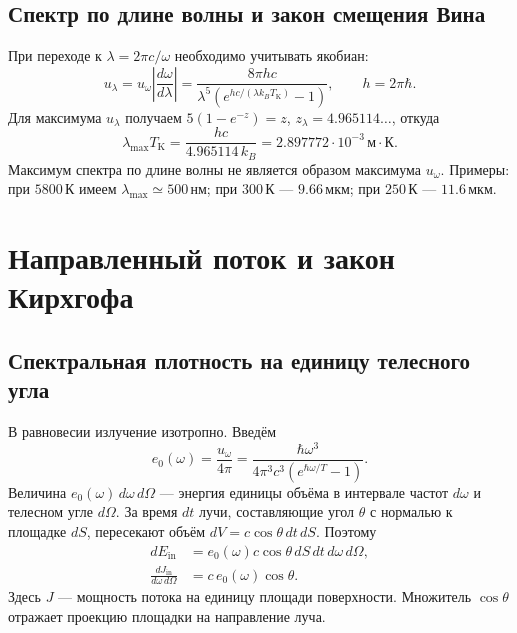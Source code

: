 \documentclass[../final.tex]{subfiles}
\begin{document}
\subsection{Спектр по длине волны и закон смещения Вина}
При переходе к $\lambda=2\pi c/\omega$ необходимо учитывать якобиан:
\begin{equation*}
 u_\lambda=u_\omega\left|\frac{d\omega}{d\lambda}\right|
 =\frac{8\pi hc}{\lambda^5(e^{hc/(\lambda k_BT_{\mathrm K})}-1)},\qquad h=2\pi\hbar.
\end{equation*}
Для максимума $u_\lambda$ получаем
$5(1-e^{-z})=z$, $z_\lambda=4.965114\ldots$, откуда
\begin{equation*}
 \lambda_{\max}T_{\mathrm K}=\frac{hc}{4.965114\,k_B}
 =2.897772\cdot10^{-3}\,\text{м}\cdot\text{К}.
\end{equation*}
Максимум спектра по длине волны не является образом максимума $u_\omega$.
Примеры: при $5800\,\text{К}$ имеем $\lambda_{\max}\simeq500\,\text{нм}$;
при $300\,\text{К}$ --- $9.66\,\text{мкм}$;
при $250\,\text{К}$ --- $11.6\,\text{мкм}$.

\clearpage
\section{Направленный поток и закон Кирхгофа}
\subsection{Спектральная плотность на единицу телесного угла}
В равновесии излучение изотропно. Введём
\begin{equation*}
 e_0(\omega)=\frac{u_\omega}{4\pi}
 =\frac{\hbar\omega^3}{4\pi^3c^3(e^{\hbar\omega/T}-1)}.
\end{equation*}
Величина $e_0(\omega)\,d\omega\,d\Omega$ --- энергия единицы объёма
в интервале частот $d\omega$ и телесном угле $d\Omega$.
За время $dt$ лучи, составляющие угол $\theta$ с нормалью к площадке $dS$,
пересекают объём $dV=c\cos\theta\,dt\,dS$. Поэтому
\begin{align*}
 dE_{\mathrm{in}}&=e_0(\omega)c\cos\theta\,dS\,dt\,d\omega\,d\Omega,\\
 \frac{dJ_{\mathrm{in}}}{d\omega\,d\Omega}
 &=c\,e_0(\omega)\cos\theta.
\end{align*}
Здесь $J$ --- мощность потока на единицу площади поверхности.
Множитель $\cos\theta$ отражает проекцию площадки на направление луча.
\end{document}
